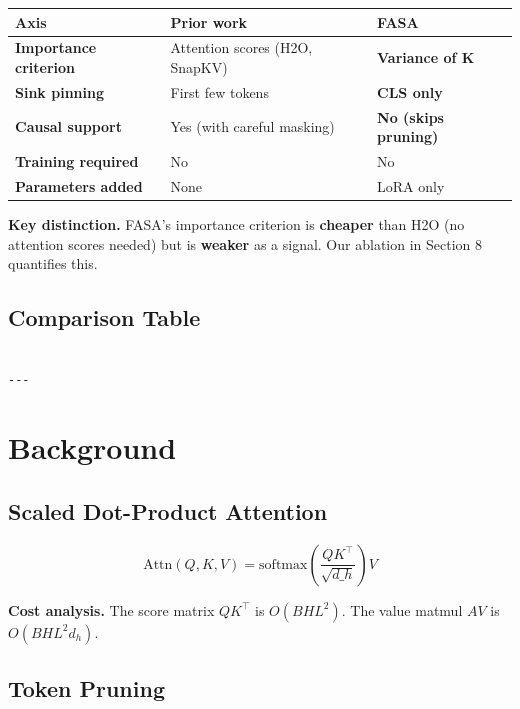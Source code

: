 \begin{table}[H]
\centering
\small
\begin{tabular}{lll}
\toprule
\textbf{Axis} & \textbf{Prior work} & \textbf{FASA} \\
\midrule
\textbf{Importance criterion} & Attention scores (H2O, SnapKV) & \textbf{Variance of K} \\
\textbf{Sink pinning} & First few tokens & \textbf{CLS only} \\
\textbf{Causal support} & Yes (with careful masking) & \textbf{No (skips pruning)} \\
\textbf{Training required} & No & No \\
\textbf{Parameters added} & None & LoRA only \\
\bottomrule
\end{tabular}
\end{table}

\textbf{Key distinction.} FASA's importance criterion is \textbf{cheaper} than H2O 
(no attention scores needed) but is \textbf{weaker} as a signal. Our ablation 
in Section 8 quantifies this.



\subsection{Comparison Table}

\begin{lstlisting}

---
\end{lstlisting}


\section{Background}

\subsection{Scaled Dot-Product Attention}

\[
\text{Attn}(Q, K, V) = \text{softmax}\!\left(\frac{QK^\top}{\sqrt{d\_h}}\right)V
\tag{3.1}
\]

\textbf{Cost analysis.} The score matrix $QK^\top$ is $O(B H L^2)$. The value 
matmul $AV$ is $O(B H L^2 d_h)$.

\subsection{Token Pruning}

